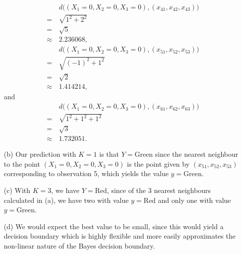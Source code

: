 \begin{itemize}
\begin{equation*}
\begin{split}
            &d\bigl((X_1 = 0, X_2 = 0, X_3 = 0), (x_{41}, x_{42}, x_{43})\bigr) \\
            = \, &\sqrt{1^2 + 2^2} \\ 
            = \, &\sqrt{5} \\ 
            \approx \, &2.236068,
        \end{split}
    \end{equation*}
    \begin{equation*}
        \begin{split}
            &d\bigl((X_1 = 0, X_2 = 0, X_3 = 0), (x_{51}, x_{52}, x_{53})\bigr) \\ 
            = \, &\sqrt{(-1)^2 + 1^2} \\
            = \, &\sqrt{2} \\ 
            \approx \, &1.414214,
        \end{split}
    \end{equation*}
    and 
    \begin{equation*}
        \begin{split}
            &d\bigl((X_1 = 0, X_2 = 0, X_3 = 0), (x_{61}, x_{62}, x_{63})\bigr) \\ 
            = \, &\sqrt{1^2 + 1^2 + 1^2} \\
            = \, &\sqrt{3} \\ 
            \approx \, &1.732051.
        \end{split}
    \end{equation*}
    \item[(b)] Our prediction with $K = 1$ is that $Y = \text{Green}$ since the 
    nearest neighbour to the point $(X_1 = 0, X_2 = 0, X_3 = 0)$ is the point
    given by $(x_{51}, x_{52}, x_{53})$ corresponding to observation 5, which yields
    the value $y = \text{Green}$.
    \item[(c)] With $K = 3$, we have $Y = \text{Red}$, since of the 3 nearest 
    neighbours calculated in (a), we have two with value $y = \text{Red}$ and only
    one with value $y = \text{Green}$.
    \item[(d)] We would expect the best value to be small, since this would yield
    a decision boundary which is highly flexible and more easily approximates the 
    non-linear nature of the Bayes decision boundary.
\end{itemize}
